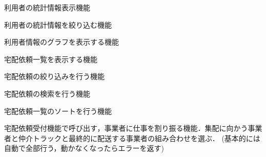 \documentclass[a4paper, titlepage]{jsarticle}
\begin{document}
\begin{description}[labelwidth=\linewidth]
  \item [利用者統計情報表示機能]利用者の統計情報表示機能
  \item [利用者情報絞り込み機能]利用者の統計情報を絞り込む機能
  \item [利用者情報グラフ表示機能]利用者情報のグラフを表示する機能

  \item [宅配依頼一覧表示機能]宅配依頼一覧を表示する機能
  \item [絞り込み機能]宅配依頼の絞り込みを行う機能
  \item [検索機能]宅配依頼の検索を行う機能
  \item [情報ソート機能]宅配依頼一覧のソートを行う機能

  \item [宅配仕事割り振り機能]宅配依頼受付機能で呼び出す，事業者に仕事を割り振る機能．集配に向かう事業者と仲介トラックと最終的に配送する事業者の組み合わせを選ぶ．
  (基本的には自動で全部行う，動かなくなったらエラーを返す)


\end{description}
\end{document}
